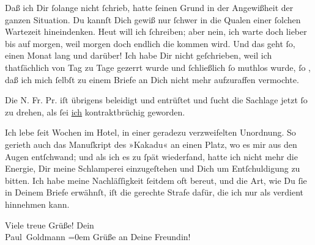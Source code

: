 \pstart
           Daß ich Dir ſolange nicht ſchrieb, hatte ſeinen Grund in der Angewißheit der ganzen
               Situation. Du kannſt Dich gewiß nur ſchwer in die Qualen einer ſolchen Wartezeit
               hineindenken. Heut will ich ſchreiben; aber nein, ich warte doch lieber bis auf
               morgen, weil morgen doch endlich die \label{K_L02869-4v}\label{K_L02869-4} kommen wird. Und das geht ſo, einen Monat lang und darüber! Ich habe Dir
               nicht geſchrieben, weil ich {\pb}thatſächlich von Tag zu
               Tage gezerrt wurde\strikeout{,} und ſchließlich ſo muthlos wurde,
               ſo \label{K_L02869-5v}\label{K_L02869-5}, daß ich mich ſelbſt zu einem Briefe an Dich nicht mehr
               aufzuraffen vermochte.\pend
           
\pstart
           Die N. Fr. Pr. iſt übrigens beleidigt und
               entrüſtet und ſucht die Sachlage jetzt ſo zu drehen, als ſei \uline{ich} kontraktbrüchig geworden.\pend
           
\pstart
           Ich lebe ſeit Wochen im Hotel, in einer geradezu verzweifelten Unordnung. So gerieth auch das
               Manuſkript des »Kakadu« an einen Platz, wo es
               mir aus den Augen entſchwand; und als ich es \introOben{}zu ſpät\introOben{}
               wiederfand, hatte ich nicht mehr die Energie, Dir meine Schlamperei einzugeſtehen und
               Dich um Entſchuldigung zu bitten. Ich habe meine Nachläſſigkeit ſeitdem oft bereut,
               und die Art, wie Du ſie in Deinem Briefe erwähnſt, iſt die gerechte Strafe dafür, die
               ich nur als verdient hinnehmen kann.\pend
           
\pstart
           Viele treue Grüße! Dein{\\[\baselineskip]}\spacefill\mbox{Paul Goldmann}\pend
           \leftskip=0em{}
\pstart
           \noindent{}Grüße an Deine Freundin!\pend
           
